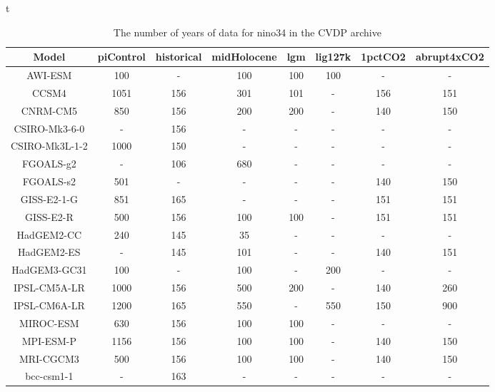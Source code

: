 \begin{table}{t}
\begin{tabular}{ c |  c | c | c | c | c | c | c  } 
\hline
Model&piControl&historical&midHolocene&lgm&lig127k&1pctCO2&abrupt4xCO2\\ \hline
AWI-ESM&100&-&100&100&100&-&-\\
CCSM4&1051&156&301&101&-&156&151\\
CNRM-CM5&850&156&200&200&-&140&150\\
CSIRO-Mk3-6-0&-&156&-&-&-&-&-\\
CSIRO-Mk3L-1-2&1000&150&-&-&-&-&-\\
FGOALS-g2&-&106&680&-&-&-&-\\
FGOALS-s2&501&-&-&-&-&140&150\\
GISS-E2-1-G&851&165&-&-&-&151&151\\
GISS-E2-R&500&156&100&100&-&151&151\\
HadGEM2-CC&240&145&35&-&-&-&-\\
HadGEM2-ES&-&145&101&-&-&140&151\\
HadGEM3-GC31&100&-&100&-&200&-&-\\
IPSL-CM5A-LR&1000&156&500&200&-&140&260\\
IPSL-CM6A-LR&1200&165&550&-&550&150&900\\
MIROC-ESM&630&156&100&100&-&-&-\\
MPI-ESM-P&1156&156&100&100&-&140&150\\
MRI-CGCM3&500&156&100&100&-&140&150\\
bcc-csm1-1&-&163&-&-&-&-&-\\
\hline
\end{tabular}
\caption{The number of years of data for nino34 in the CVDP archive}
\end{table}
